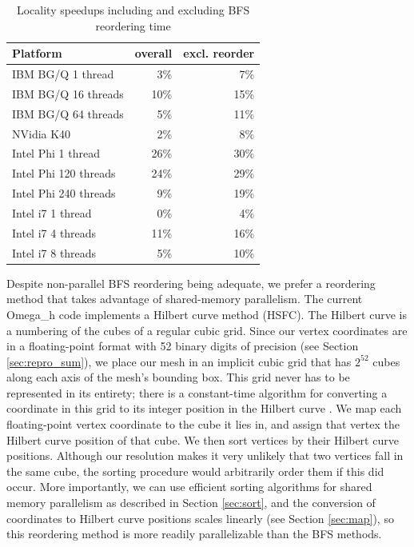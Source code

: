 \begin{table}
\begin{center}
\caption{Locality speedups including and excluding BFS reordering time}
\label{tab:reorder-speed}
\begin{tabular}{l|r|r}
Platform           & overall & excl. reorder \\ \hline
IBM BG/Q 1 thread     &  3\% &  7\% \\
IBM BG/Q 16 threads   & 10\% & 15\% \\
IBM BG/Q 64 threads   &  5\% & 11\% \\
NVidia K40            &  2\% &  8\% \\
Intel Phi 1 thread    & 26\% & 30\% \\
Intel Phi 120 threads & 24\% & 29\% \\
Intel Phi 240 threads &  9\% & 19\% \\
Intel i7 1 thread     &  0\% &  4\% \\
Intel i7 4 threads    & 11\% & 16\% \\
Intel i7 8 threads    &  5\% & 10\% \\
\end{tabular}
\end{center}
\end{table}

Despite non-parallel BFS reordering being adequate, we prefer
a reordering method that takes advantage of shared-memory parallelism.
The current Omega\_h code implements a Hilbert curve method (HSFC).
The Hilbert curve is a numbering of the cubes of a regular cubic grid.
Since our vertex coordinates are in a floating-point format with
52 binary digits of precision (see Section \ref{sec:repro_sum}),
we place our mesh in an implicit cubic grid that has $2^{52}$
cubes along each axis of the mesh's bounding box.
This grid never has to be represented in its entirety; there
is a constant-time algorithm for converting a coordinate in this
grid to its integer position in the Hilbert curve
\cite{skilling2004programming}.
We map each floating-point vertex coordinate to the cube it
lies in, and assign that vertex the Hilbert curve position of that
cube.
We then sort vertices by their Hilbert curve positions.
Although our resolution makes it very unlikely that two
vertices fall in the same cube, the sorting procedure would
arbitrarily order them if this did occur.
More importantly, we can use efficient sorting algorithms for
shared memory parallelism as described in Section \ref{sec:sort},
and the conversion of coordinates to Hilbert curve positions
scales linearly (see Section \ref{sec:map}), so this reordering
method is more readily parallelizable than the BFS methods.

